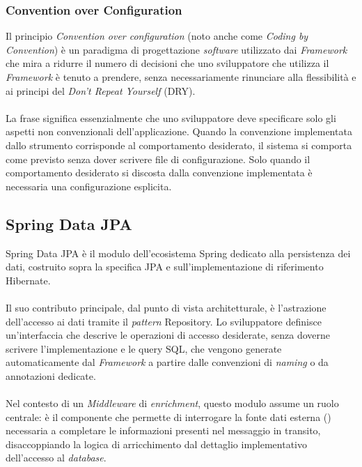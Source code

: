 \subsubsection{Convention over Configuration}
\label{Convention over Configuration}
Il principio \textit{Convention over configuration} (noto anche come \textit{Coding by Convention}) è un paradigma di progettazione \textit{software} utilizzato dai \textit{\gls{Framework}} che mira a ridurre il numero di decisioni che uno sviluppatore che utilizza il \textit{\gls{Framework}} è tenuto a prendere, senza necessariamente rinunciare alla flessibilità e ai principi del \textit{Don't Repeat Yourself} (\acrshort{DRY}). \\ \\
La frase significa essenzialmente che uno sviluppatore deve specificare solo gli aspetti non convenzionali dell'applicazione.
Quando la convenzione implementata dallo strumento corrisponde al comportamento desiderato, il sistema si comporta come previsto senza dover scrivere file di configurazione. Solo quando il comportamento desiderato si discosta dalla convenzione implementata è necessaria una configurazione esplicita.

\subsection{Spring Data JPA}
\label{Spring Data JPA}
Spring Data JPA è il modulo dell'ecosistema Spring dedicato alla persistenza dei dati, costruito sopra la specifica \acrshort{JPA} e sull'implementazione di riferimento \gls{Hibernate}. \\ \\
Il suo contributo principale, dal punto di vista architetturale, è l'astrazione dell'accesso ai dati tramite il \textit{pattern} Repository.
Lo sviluppatore definisce un'interfaccia che descrive le operazioni di accesso desiderate, senza doverne scrivere l'implementazione e le query \acrshort{SQL}, che vengono generate automaticamente dal \textit{\gls{Framework}} a partire dalle convenzioni di \textit{naming} o da annotazioni dedicate. \\ \\
Nel contesto di un \textit{Middleware} di \textit{enrichment}, questo modulo assume un ruolo centrale: è il componente che permette di interrogare la fonte dati esterna () necessaria a completare le informazioni presenti nel messaggio in transito, disaccoppiando la logica di arricchimento dal dettaglio implementativo dell'accesso al \textit{database}.

